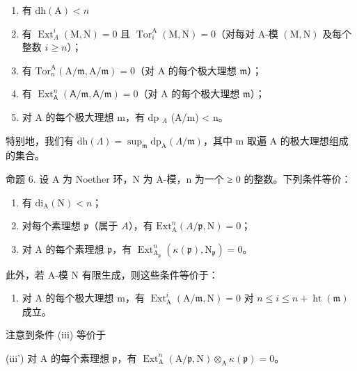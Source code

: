 \begin{enumerate}
\def\labelenumi{(\roman{enumi})}
\item
  有 \(\mathrm{dh}(\mathrm{A}) < n\)
\item
  有 \(\operatorname{Ext}_A^i (\mathrm{M},\mathrm{N}) = 0\) 且 \(\operatorname{Tor}_i^{\mathrm{A}}(\mathrm{M},\mathrm{N}) = 0\)（对每对 A-模 \((\mathrm{M},\mathrm{N})\) 及每个整数 \(i\geqslant n\)）；
\item
  有 \(\mathrm{Tor}_n^{\mathrm{A}}(\mathrm{A} / \mathfrak{m},\mathrm{A} / \mathfrak{m}) = 0\)（对 A 的每个极大理想 \(\mathfrak{m}\)）；
\item
  有 \(\operatorname{Ext}_{\mathsf{A}}^{n}(\mathsf{A} / \mathfrak{m},\mathsf{A} / \mathfrak{m}) = 0\)（对 A 的每个极大理想 \(\mathfrak{m}\)）；
\item
  对 A 的每个极大理想 m，有 dp \(_{A}\) (A/m) \textless{} n。
\end{enumerate}

特别地，我们有 \(\mathrm{dh}(\Lambda)=\sup_{\mathfrak{m}}\mathrm{dp}_{\mathrm{A}}(\Lambda/\mathfrak{m})\)，其中 m 取遍 A 的极大理想组成的集合。

命题 6. 设 A 为 Noether 环，N 为 A-模，n 为一个 ≥ 0 的整数。下列条件等价：

\begin{enumerate}
\def\labelenumi{(\roman{enumi})}
\item
  有 \(\mathrm{di}_{\mathrm{A}}(\mathrm{N}) < n\)；
\item
  对每个素理想 \(\mathfrak{p}\)（属于 \(A\)），有 \(\mathrm{Ext}_{\mathrm{A}}^{n}(A/\mathfrak{p},\mathrm{N})=0\)；
\item
  对 A 的每个素理想 \(\mathfrak{p}\)，有 \(\operatorname{Ext}_{\mathrm{A}_{\mathfrak{p}}}^{n}(\kappa(\mathfrak{p}),\mathrm{N}_{\mathfrak{p}})=0\)。
\end{enumerate}

此外，若 A-模 N 有限生成，则这些条件等价于：

\begin{enumerate}
\def\labelenumi{(\roman{enumi})}
\setcounter{enumi}{3}
\tightlist
\item
  对 A 的每个极大理想 m，有 \(\operatorname{Ext}_{\mathrm{A}}^{i}(\mathrm{A}/\mathfrak{m},\mathrm{N})=0\) 对 \(n\leqslant i\leqslant n+\operatorname{ht}(\mathfrak{m})\) 成立。
\end{enumerate}

注意到条件 (iii) 等价于

(iii') 对 A 的每个素理想 \(\mathfrak{p}\)，有 \(\operatorname{Ext}_{\mathrm{A}}^{n}(\mathrm{A}/\mathfrak{p},\mathrm{N})\otimes_{\mathrm{A}}\kappa(\mathfrak{p})=0\)。

